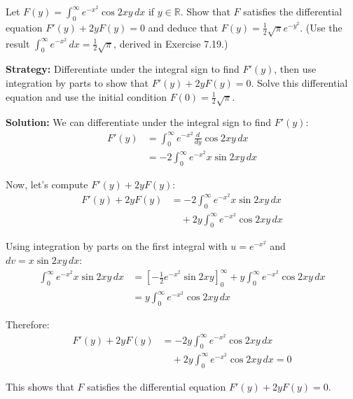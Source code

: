\begin{problembox}
\begin{problemstatement}
Let $F(y) = \int_{0}^{\infty} e^{-x^2} \cos 2xy \, dx$ if $y \in \mathbb{R}$. Show that $F$ satisfies the differential equation $F'(y) + 2y F(y) = 0$ and deduce that $F(y) = \frac{1}{2} \sqrt{\pi} e^{-y^2}$. (Use the result $\int_{0}^{\infty} e^{-x^2} \, dx = \frac{1}{2} \sqrt{\pi}$, derived in Exercise 7.19.)
\end{problemstatement}
\end{problembox}

\noindent\textbf{Strategy:} Differentiate under the integral sign to find $F'(y)$, then use integration by parts to show that $F'(y) + 2y F(y) = 0$. Solve this differential equation and use the initial condition $F(0) = \frac{1}{2} \sqrt{\pi}$.

\bigskip\noindent\textbf{Solution:}
We can differentiate under the integral sign to find $F'(y)$:
\begin{align*}
F'(y) &= \int_{0}^{\infty} e^{-x^2} \frac{d}{dy} \cos 2xy \, dx \\
&= -2 \int_{0}^{\infty} e^{-x^2} x \sin 2xy \, dx
\end{align*}

Now, let's compute $F'(y) + 2y F(y)$:
\begin{align*}
F'(y) + 2y F(y) &= -2 \int_{0}^{\infty} e^{-x^2} x \sin 2xy \, dx \\
&\quad + 2y \int_{0}^{\infty} e^{-x^2} \cos 2xy \, dx
\end{align*}

Using integration by parts on the first integral with $u = e^{-x^2}$ and $dv = x \sin 2xy \, dx$:
\begin{align*}
\int_{0}^{\infty} e^{-x^2} x \sin 2xy \, dx &= \left[-\frac{1}{2} e^{-x^2} \sin 2xy\right]_{0}^{\infty} + y \int_{0}^{\infty} e^{-x^2} \cos 2xy \, dx \\
&= y \int_{0}^{\infty} e^{-x^2} \cos 2xy \, dx
\end{align*}

Therefore:
\begin{align*}
F'(y) + 2y F(y) &= -2y \int_{0}^{\infty} e^{-x^2} \cos 2xy \, dx \\
&\quad + 2y \int_{0}^{\infty} e^{-x^2} \cos 2xy \, dx = 0
\end{align*}


This shows that $F$ satisfies the differential equation $F'(y) + 2y F(y) = 0$.

